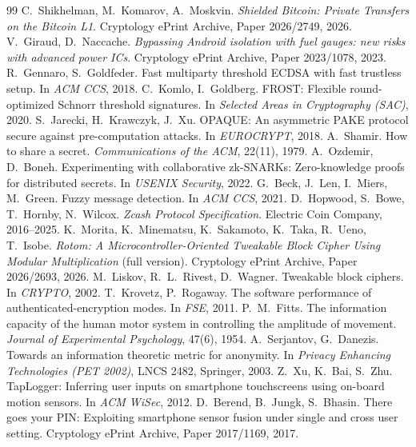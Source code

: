 \documentclass[11pt]{article}
\theoremstyle{remark}
\begin{document}
\begin{thebibliography}{99}\small
{} C.~Shikhelman, M.~Komarov, A.~Moskvin. \emph{Shielded Bitcoin: Private Transfers on the Bitcoin L1}. Cryptology ePrint Archive, Paper 2026/2749, 2026.
 V.~Giraud, D.~Naccache. \emph{Bypassing Android isolation with fuel gauges: new risks with advanced power ICs}. Cryptology ePrint Archive, Paper 2023/1078, 2023.
 R.~Gennaro, S.~Goldfeder. Fast multiparty threshold ECDSA with fast trustless setup. In \emph{ACM CCS}, 2018.
 C.~Komlo, I.~Goldberg. FROST: Flexible round-optimized Schnorr threshold signatures. In \emph{Selected Areas in Cryptography (SAC)}, 2020.
 S.~Jarecki, H.~Krawczyk, J.~Xu. OPAQUE: An asymmetric PAKE protocol secure against pre-computation attacks. In \emph{EUROCRYPT}, 2018.
 A.~Shamir. How to share a secret. \emph{Communications of the ACM}, 22(11), 1979.
 A.~Ozdemir, D.~Boneh. Experimenting with collaborative zk-SNARKs: Zero-knowledge proofs for distributed secrets. In \emph{USENIX Security}, 2022.
 G.~Beck, J.~Len, I.~Miers, M.~Green. Fuzzy message detection. In \emph{ACM CCS}, 2021.
 D.~Hopwood, S.~Bowe, T.~Hornby, N.~Wilcox. \emph{Zcash Protocol Specification}. Electric Coin Company, 2016--2025.
 K.~Morita, K.~Minematsu, K.~Sakamoto, K.~Taka, R.~Ueno, T.~Isobe. \emph{Rotom: A Microcontroller-Oriented Tweakable Block Cipher Using Modular Multiplication} (full version). Cryptology ePrint Archive, Paper 2026/2693, 2026.
 M.~Liskov, R.~L.~Rivest, D.~Wagner. Tweakable block ciphers. In \emph{CRYPTO}, 2002.
 T.~Krovetz, P.~Rogaway. The software performance of authenticated-encryption modes. In \emph{FSE}, 2011.
 P.~M.~Fitts. The information capacity of the human motor system in controlling the amplitude of movement. \emph{Journal of Experimental Psychology}, 47(6), 1954.
 A.~Serjantov, G.~Danezis. Towards an information theoretic metric for anonymity. In \emph{Privacy Enhancing Technologies (PET 2002)}, LNCS 2482, Springer, 2003.
 Z.~Xu, K.~Bai, S.~Zhu. TapLogger: Inferring user inputs on smartphone touchscreens using on-board motion sensors. In \emph{ACM WiSec}, 2012.
 D.~Berend, B.~Jungk, S.~Bhasin. There goes your PIN: Exploiting smartphone sensor fusion under single and cross user setting. Cryptology ePrint Archive, Paper 2017/1169, 2017.
\end{thebibliography}
\end{document}
